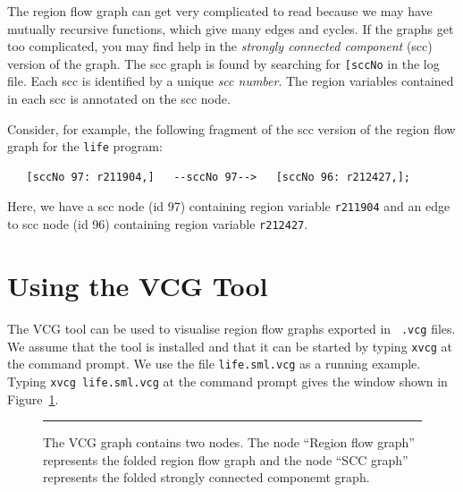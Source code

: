\documentclass[12pt]{book}
\begin{document}
The region flow graph can get very complicated to read because we may have
mutually recursive functions, which give many edges and cycles.  If the
graphs get too complicated, you may find help in the 
%
{\em strongly connected component\/} (scc) version of the graph.  The
scc graph is found by searching for \texttt{[sccNo} in the log file.
Each scc is identified by a unique {\em scc number}. The region
variables contained in each scc is annotated on the scc node.

Consider, for example, the following fragment of the scc version of
the region flow graph for the {\tt life} program:
\begin{verbatim}
   [sccNo 97: r211904,]   --sccNo 97-->   [sccNo 96: r212427,];
\end{verbatim}
Here, we have a scc node (id 97) containing region variable
\texttt{r211904} and an edge to scc node (id 96) containing region
variable \texttt{r212427}.

\section{Using the VCG Tool}

The 
%
VCG tool can be used to visualise region flow graphs exported in {\tt
  .vcg} files. We assume that the tool is installed and that it can be
started by typing \texttt{xvcg} at the command prompt.  We use the file
\texttt{life.sml.vcg} as a running example. Typing \mbox{\texttt{xvcg
    life.sml.vcg}} at the command prompt gives the window shown in
Figure~\ref{vcg1.fig}.
\begin{figure}[htb]
\begin{center}
\end{center}
\caption{The VCG graph contains two nodes. The
  node ``Region flow graph'' represents the folded region flow graph and
  the node ``SCC graph'' represents the folded strongly connected
  componemt graph.}
\label{vcg1.fig}
\medskip\hrule
\end{figure}
\end{document}
